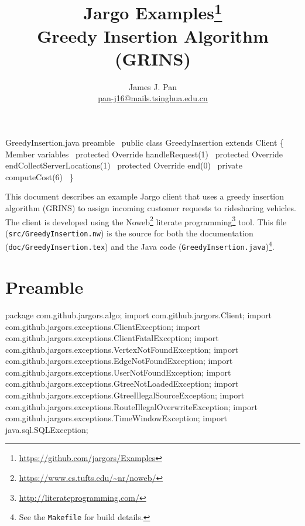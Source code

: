 \documentclass{article}
\title{Jargo Examples\footnote{
  \url{https://github.com/jargors/Examples}}\\
  \vspace{.5em}
  \Large{\textbf{Greedy Insertion Algorithm (GRINS)}}}
\author{James J. Pan\\
  \small{\href{mailto:pan-j16@mails.tsinghua.edu.cn}{pan-j16@mails.tsinghua.edu.cn}}}
\def\nwendcode{\endtrivlist \endgroup}      %
\let\nwdocspar=\par
\begin{document}
\maketitle
\pagestyle{noweb}

\endmoddef{}
\LA{}GreedyInsertion.java preamble~{\nwtagstyle{}}\RA{}
public class GreedyInsertion extends Client \{
  \LA{}Member variables~{\nwtagstyle{}}\RA{}
  protected \LA{}Override handleRequest(1)~{\nwtagstyle{}}\RA{}
  protected \LA{}Override endCollectServerLocations(1)~{\nwtagstyle{}}\RA{}
  protected \LA{}Override end(0)~{\nwtagstyle{}}\RA{}
  private \LA{}computeCost(6)~{\nwtagstyle{}}\RA{}
\}
\nwendcode{}\nwdocspar

This document describes an example Jargo client that uses a greedy insertion
algorithm (GRINS) to assign incoming customer requests to ridesharing vehicles.
The client is developed using the
Noweb\footnote{\url{https://www.cs.tufts.edu/~nr/noweb/}} literate
programming\footnote{\url{http://literateprogramming.com/}} tool.  This file
({\tt{}src/GreedyInsertion.nw}) is the source for both the documentation
({\tt{}doc/GreedyInsertion.tex}) and the Java code
({\tt{}GreedyInsertion.java})\footnote{See the {\tt{}Makefile} for build details.}.

\section{Preamble}
\nwenddocs{}\endmoddef{}
package com.github.jargors.algo;
import com.github.jargors.Client;
import com.github.jargors.exceptions.ClientException;
import com.github.jargors.exceptions.ClientFatalException;
import com.github.jargors.exceptions.VertexNotFoundException;
import com.github.jargors.exceptions.EdgeNotFoundException;
import com.github.jargors.exceptions.UserNotFoundException;
import com.github.jargors.exceptions.GtreeNotLoadedException;
import com.github.jargors.exceptions.GtreeIllegalSourceException;
import com.github.jargors.exceptions.RouteIllegalOverwriteException;
import com.github.jargors.exceptions.TimeWindowException;
import java.sql.SQLException;
\nwendcode{}\nwdocspar
\end{document}
